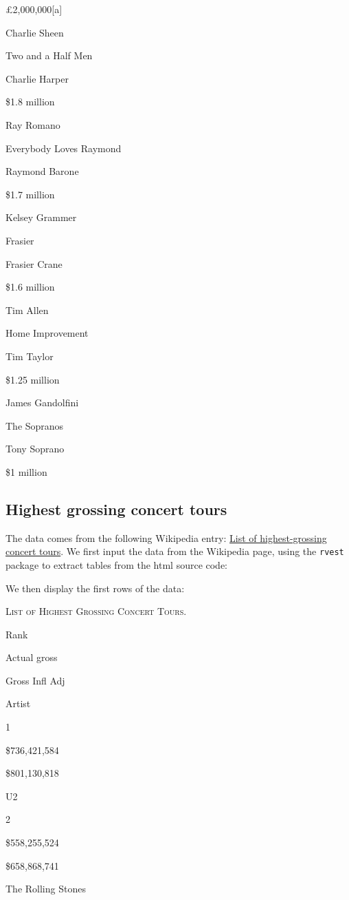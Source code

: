 \documentclass[]{book}
\theoremstyle{definition}
\theoremstyle{definition}
\theoremstyle{definition}
\theoremstyle{remark}
\begin{document}
£2,000,000{[}a{]}

Charlie Sheen

Two and a Half Men

Charlie Harper

\$1.8 million

Ray Romano

Everybody Loves Raymond

Raymond Barone

\$1.7 million

Kelsey Grammer

Frasier

Frasier Crane

\$1.6 million

Tim Allen

Home Improvement

Tim Taylor

\$1.25 million

James Gandolfini

The Sopranos

Tony Soprano

\$1 million

\subsection{Highest grossing concert
tours}\label{highest-grossing-concert-tours}

The data comes from the following Wikipedia entry:
\href{https://en.wikipedia.org/wiki/List_of_highest-grossing_concert_tours}{List
of highest-grossing concert tours}. We first input the data from the
Wikipedia page, using the \texttt{rvest} package to extract tables from
the html source code:




We then display the first rows of the data:

\label{tab:highest-grossing-concert}\textsc{List of Highest Grossing Concert
Tours.}

Rank

Actual gross

Gross Infl Adj

Artist

1

\$736,421,584

\$801,130,818

U2

2

\$558,255,524

\$658,868,741

The Rolling Stones
\end{document}
